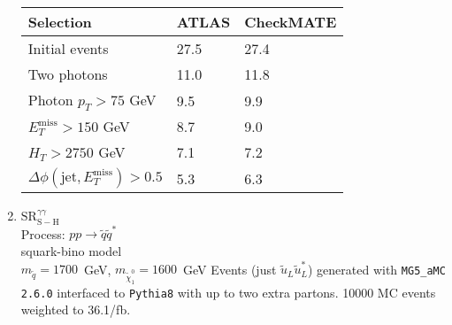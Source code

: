 \documentclass[12pt,fleqn]{article}
\begin{document}
\begin{enumerate}
\begin{table}[h!] 
 \renewcommand*{\arraystretch}{1.2}
 \begin{tabular}{l|p{3cm}|p{3cm}} \toprule
  Selection                                                                       & ATLAS    & CheckMATE       \\ \midrule
  Initial events                                                                  & 27.5     &  27.4          \\
  Two photons                                                                     & 11.0     &  11.8 \\
  Photon $p_T>75$ GeV                                                             &  9.5     &   9.9 \\
  $E_T^\mathrm{miss} > 150$ GeV                                                   &  8.7     &   9.0 \\
  $H_T > 2750$ GeV                                                                &  7.1     &   7.2  \\ 
  $\Delta\phi(\mathrm{jet},E_T^\mathrm{miss}) > 0.5$                              &  5.3     &   6.3 \\   \bottomrule
 \end{tabular}
\end{table} 

\item{$\mathrm{SR}^{\gamma\gamma}_{\mathrm{S-H}}$\\}
 Process: $ p p \to \tilde{q} \tilde{q}^*$\\
 squark-bino model\\
 $m_{\tilde{q}} = 1700$~GeV, $m_{\tilde{\chi}_1^0} = 1600$~GeV
 Events (just $\tilde{u}_L\tilde{u}_L^*$) generated with \texttt{MG5\_aMC 2.6.0} interfaced to \texttt{Pythia8} with up to two extra partons.
 10000 MC events weighted to 36.1/fb.


\end{enumerate}
\end{document}
